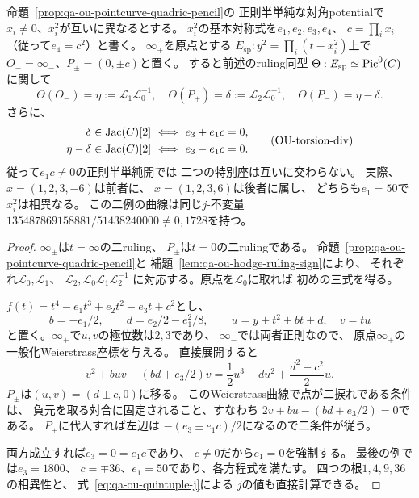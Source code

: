 \begin{proposition}[spectral座標での二つの二捩れ特別座の方程式]
\label{prop:qa-ou-spectral-torsion-divisors}
命題~\ref{prop:qa-ou-pointcurve-quadric-pencil}の
正則半単純な対角potentialで
$x_i\ne0$、$x_i^2$が互いに異なるとする。
$x_i^2$の基本対称式を$e_1,e_2,e_3,e_4$、
$c=\prod_i x_i$（従って$e_4=c^2$）と書く。
$\infty_+$を原点とする
$E_{\mathrm{sp}}:y^2=\prod_i(t-x_i^2)$上で
$O_-=\infty_-$、$P_\pm=(0,\pm c)$と置く。
すると前述のruling同型
$\Theta:E_{\mathrm{sp}}\simeq\operatorname{Pic}^0(C)$に関して
\[
 \Theta(O_-)=\eta:=\mathcal L_1\mathcal L_0^{-1},
 \quad \Theta(P_+)=\delta:=\mathcal L_2\mathcal L_0^{-1},
 \quad \Theta(P_-)=\eta-\delta.
\]
さらに、
\[
 \begin{split}
 \delta\in\operatorname{Jac}(C)[2]&\ \Longleftrightarrow\
                  e_3+e_1c=0,\\
 \eta-\delta\in\operatorname{Jac}(C)[2]&\ \Longleftrightarrow\
                  e_3-e_1c=0 .
 \end{split}
 \tag{OU-torsion-div}\label{eq:qa-ou-torsion-divisors}
\]
従って$e_1c\ne0$の正則半単純開では
二つの特別座は互いに交わらない。
実際、$x=(1,2,3,-6)$は前者に、
$x=(1,2,3,6)$は後者に属し、
どちらも$e_1=50$で$x_i^2$は相異なる。
この二例の曲線は同じ$j$-不変量
$135487869158881/51438240000\ne0,1728$を持つ。
\end{proposition}
\begin{proof}
$\infty_\pm$は$t=\infty$の二ruling、
$P_\pm$は$t=0$の二rulingである。
命題~\ref{prop:qa-ou-pointcurve-quadric-pencil}と
補題~\ref{lem:qa-ou-hodge-ruling-sign}により、
それぞれ$\mathcal L_0,\mathcal L_1$、
$\mathcal L_2,\mathcal L_0\mathcal L_1\mathcal L_2^{-1}$
に対応する。原点を$\mathcal L_0$に取れば
初めの三式を得る。

$f(t)=t^4-e_1t^3+e_2t^2-e_3t+c^2$とし、
\[
 b=-e_1/2,\qquad d=e_2/2-e_1^2/8,\qquad
 u=y+t^2+bt+d,\quad v=tu
\]
と置く。$\infty_+$で$u,v$の極位数は$2,3$であり、
$\infty_-$では両者正則なので、
原点$\infty_+$の一般化Weierstrass座標を与える。
直接展開すると
\[
 v^2+buv-(bd+e_3/2)v
   =\frac12u^3-du^2+\frac{d^2-c^2}{2}u .
 \tag{OU-W}\label{eq:qa-ou-spectral-weierstrass}
\]
$P_\pm$は$(u,v)=(d\pm c,0)$に移る。
このWeierstrass曲線で点が二捩れである条件は、
負元を取る対合に固定されること、すなわち
$2v+bu-(bd+e_3/2)=0$である。
$P_\pm$に代入すれば左辺は
$-(e_3\pm e_1c)/2$になるので二条件が従う。

両方成立すれば$e_3=0=e_1c$であり、
$c\ne0$だから$e_1=0$を強制する。
最後の例では$e_3=1800$、
$c=\mp36$、$e_1=50$であり、各方程式を満たす。
四つの根$1,4,9,36$の相異性と、
式~\eqref{eq:qa-ou-quintuple-j}による
$j$の値も直接計算できる。
\end{proof}

